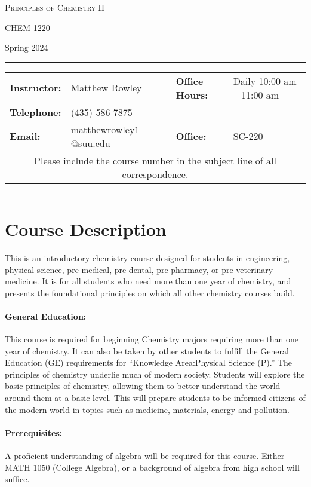 \documentclass[12pt, letterpaper]{article}
\begin{document}
\begin{center}
	{\Large \textsc{Principles of Chemistry II}}

	CHEM 1220
\end{center}
\begin{center}
	{\large Spring 2024}
\end{center}
\begin{center}
	\rule{0.99\textwidth}{0.4pt}
	\begin{tabular}{llcll}
		\textbf{Instructor:} & Matthew Rowley           &  & \textbf{Office Hours:} & Daily 10:00 am -- 11:00 am \\
		\textbf{Telephone:}  & (435) 586-7875           &  &                        &                            \\
		\textbf{Email:}      & matthewrowley$1$@suu.edu &  & \textbf{Office:}       & SC-220                     \\
		\multicolumn{5}{c}{Please include the course number in the subject line of all correspondence.}
	\end{tabular}
	\rule{0.99\textwidth}{0.4pt}
\end{center}

\section*{Course Description}
This is an introductory chemistry course designed for students in engineering, physical science, pre-medical, pre-dental, pre-pharmacy, or pre-veterinary medicine. It is for all students who need more than one year of chemistry, and presents the foundational principles on which all other chemistry courses build.

\paragraph{General Education:}
This course is required for beginning Chemistry majors requiring more than one year of chemistry. It can also be taken by other students to fulfill the General Education (GE) requirements for ``Knowledge Area:Physical Science (P).'' The principles of chemistry underlie much of modern society. Students will explore the basic principles of chemistry, allowing them to better understand the world around them at a basic level. This will prepare students to be informed citizens of the modern world in topics such as medicine, materials, energy and pollution.

\paragraph{Prerequisites:}
A proficient understanding of algebra will be required for this course. Either MATH 1050 (College Algebra), or a background of algebra from high school will suffice.
\end{document}

